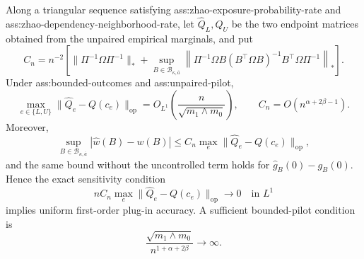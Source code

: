 Along a triangular sequence satisfying ass:zhao-exposure-probability-rate and ass:zhao-dependency-neighborhood-rate, let \(\widehat Q_L,\widehat Q_U\) be the two endpoint matrices obtained from the unpaired empirical marginals, and put
\[
C_n=n^{-2}\left[
\lVert\Pi^{-1}\Omega\Pi^{-1}\rVert_*
+\sup_{B\in\mathcal B_{\kappa,\overline a}}
\left\lVert\Pi^{-1}\Omega B(B^{\top}\Omega B)^{-1}B^{\top}\Omega\Pi^{-1}\right\rVert_*
\right].
\]
Under ass:bounded-outcomes and ass:unpaired-pilot,
\[
\max_{e\in\{L,U\}}\lVert\widehat Q_e-Q(c_e)\rVert_{\mathrm{op}}
=O_{L^1}\!\left(\frac{n}{\sqrt{m_1\wedge m_0}}\right),
\qquad
C_n=O\!\left(n^{\alpha+2\beta-1}\right).
\]
Moreover,
\[
\sup_{B\in\mathcal B_{\kappa,\overline a}}
|\widehat w(B)-w(B)|
\le C_n\max_e\lVert\widehat Q_e-Q(c_e)\rVert_{\mathrm{op}},
\]
and the same bound without the uncontrolled term holds for \(\widehat g_B(0)-g_B(0)\).  Hence the exact sensitivity condition
\[
nC_n\max_e\lVert\widehat Q_e-Q(c_e)\rVert_{\mathrm{op}}
\longrightarrow0
\quad\text{in }L^1
\]
implies uniform first-order plug-in accuracy.  A sufficient bounded-pilot condition is
\[
\frac{\sqrt{m_1\wedge m_0}}{n^{1+\alpha+2\beta}}\longrightarrow\infty.
\]